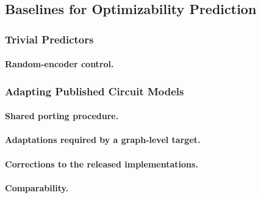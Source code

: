 \subsection{Baselines for Optimizability Prediction}
\label{sec:method:architecture:baselines}

\subsubsection{Trivial Predictors}
\label{sec:method:baselines:trivial}

\paragraph{Random-encoder control.}

\subsubsection{Adapting Published Circuit Models}
\label{sec:method:baselines:published}

\paragraph{Shared porting procedure.}

\paragraph{Adaptations required by a graph-level target.}

\paragraph{Corrections to the released implementations.}

\paragraph{Comparability.}
